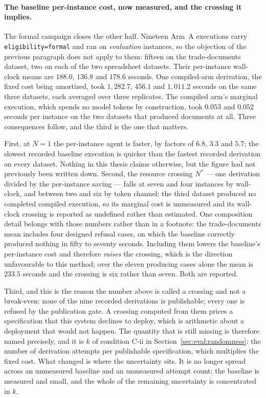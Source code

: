 \paragraph{The baseline per-instance cost, now measured, and the crossing it implies.}
The formal campaign closes the other half. Nineteen Arm~A executions carry
\texttt{eligibility=formal} and ran on \emph{evaluation} instances, so the objection of the
previous paragraph does not apply to them: fifteen on the trade-documents dataset, two on each
of the two spreadsheet datasets. Their per-instance wall-clock means are $188.0$, $136.8$ and
$178.6$ seconds. One compiled-arm derivation, the fixed cost being amortized, took $1{,}282.7$,
$456.1$ and $1{,}011.2$ seconds on the same three datasets, each averaged over three
replicates. The compiled arm's marginal execution, which spends no model tokens by
construction, took $0.053$ and $0.052$ seconds per instance on the two datasets that produced
documents at all. Three consequences follow, and the third is the one that matters.

First, at $N=1$ the per-instance agent is faster, by factors of $6.8$, $3.3$ and $5.7$; the
slowest recorded baseline execution is quicker than the fastest recorded derivation on every
dataset. Nothing in this thesis claims otherwise, but the figure had not previously been
written down. Second, the resource crossing $N^{*}$ --- one derivation divided by the
per-instance saving --- falls at seven and four instances by wall-clock, and between two and six
by token channel; the third dataset produced no completed compiled execution, so its marginal
cost is unmeasured and its wall-clock crossing is reported as undefined rather than estimated.
One composition detail belongs with those numbers rather than in a footnote: the
trade-documents mean includes four designed refusal cases, on which the baseline correctly
produced nothing in fifty to seventy seconds. Including them lowers the baseline's per-instance
cost and therefore \emph{raises} the crossing, which is the direction unfavourable to this
method; over the eleven producing cases alone the mean is $233.5$ seconds and the crossing is
six rather than seven. Both are reported.

Third, and this is the reason the number above is called a crossing and not a break-even: none
of the nine recorded derivations is publishable; every one is refused by the publication gate.
A crossing computed from them prices a specification that this system declines to deploy, which
is arithmetic about a deployment that would not happen.
The quantity that is still missing is therefore named precisely, and it is $k$ of condition
C-ii in Section~\ref{sec:eval:randomness}: the number of derivation attempts per publishable
specification, which multiplies the fixed cost. What changed is where the uncertainty sits. It
is no longer spread across an unmeasured baseline and an unmeasured attempt count; the baseline
is measured and small, and the whole of the remaining uncertainty is concentrated in $k$.


